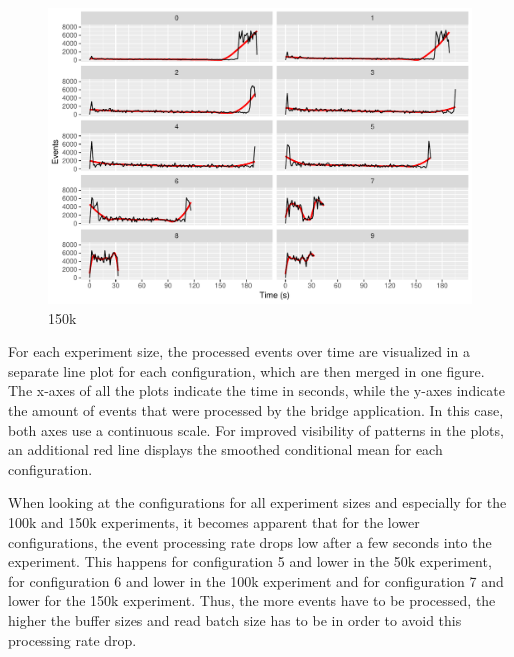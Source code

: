 \begin{figure}[htb]
        \includegraphics[width=\textwidth]{gfx/config-comparison_150k.pdf}
        \caption{150k}
        \label{fig:evaluation:performance:config-comparison_150k}
\end{figure}

For each experiment size, the processed events over time are visualized in a separate line plot for each configuration, which are then merged in one figure.
The x-axes of all the plots indicate the time in seconds, while the y-axes indicate the amount of events that were processed by the bridge application.
In this case, both axes use a continuous scale.
For improved visibility of patterns in the plots, an additional red line displays the smoothed conditional mean for each configuration.

When looking at the configurations for all experiment sizes and especially for the 100k and 150k experiments, it becomes apparent that for the lower configurations, the event processing rate drops low after a few seconds into the experiment.
This happens for configuration 5 and lower in the 50k experiment, for configuration 6 and lower in the 100k experiment and for configuration 7 and lower for the 150k experiment.
Thus, the more events have to be processed, the higher the buffer sizes and read batch size has to be in order to avoid this processing rate drop.

